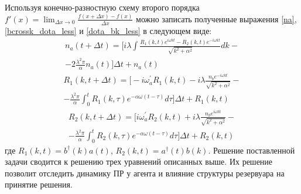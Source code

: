 Используя конечно-разностную схему второго порядка $f'(x) = \lim_{\Delta x \to 0} \frac{f(x + \Delta x) - f(x)}{\Delta x}$
можно записать полученные выражения \eqref{na}, \eqref{bcrossk_dota_less} и \eqref{dota_bk_less} в следующем виде:
\begin{multline}
    n_{a}(t + \Delta t) =
    \Biggl[i \lambda \int \frac{R_{1}(k,t) e^{i \omega k t} - R_{2}(k,t) e^{-i \omega k t}}{\sqrt{k^{2} + \alpha^2}} dk - \\
    - 2 \frac{\lambda^{2} \pi}{\alpha} n_{a}(t) \Biggr] \Delta t + n_{a}(t)
\end{multline}
\begin{multline}
    R_{1}(k,t + \Delta t) =
    \Biggl[-i \omega^{'}_{a} R_{1}(k,t)
    -i \lambda \frac{n_{b} e^{-i \omega k t}}{\sqrt{k^{2} + \alpha^2}} - \\
    -\frac{\lambda^{2} \pi}{\alpha} \int_{0}^{t} R_{1}(k,\tau) e^{- \alpha \omega (t - \tau)} d\tau \Biggr] \Delta t + R_{1}(k,t)
\end{multline}
\begin{multline}
    R_{2}(k,t + \Delta t) =
    \Biggl[i \omega^{'}_{a} R_{2}(k,t)
    + i \lambda \frac{n_{b} e^{i \omega k t}}{\sqrt{k^{2} + \alpha^2}} - \\
    - \frac{\lambda^{2} \pi}{\alpha} \int_{0}^{t} R_{2}(k,\tau) e^{- \alpha \omega (t - \tau)} d\tau \Biggr] \Delta t + R_{2}(k,t)
\end{multline}
где  $R_{1}(k,t) = b^{\dagger}(k) a(t)$, $R_{2}(k,t) = a^{\dagger}(t) b(k)$.
Решение поставленной задачи сводится к решению трех уравнений описанных выше. Их решение позволит отследить динамику ПР у агента и влияние структуры резервуара
на принятие решения.